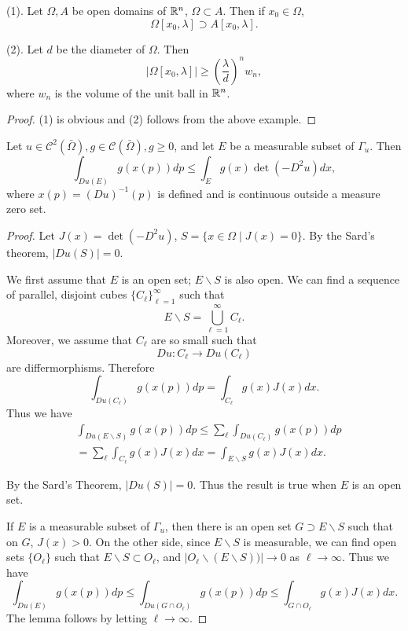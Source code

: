 \begin{lemma}\label{16} (1). Let $\Omega,A$ be open domains of $\mathbb R^n$, $\Omega\subset A$. Then if $x_0\in\Omega$,
\[
\Omega[x_0,\lambda]\supset A[x_0,\lambda].
\]

(2). Let $d$ be the diameter of $\Omega$. Then
\[
|\Omega[x_0,\lambda]|\geq\left(\frac{\lambda}{d}\right)^nw_n,
\]
where $w_n$ is the volume of the unit ball in $\mathbb R^n$.
\end{lemma}

\begin{proof} (1) is obvious and (2) follows from the above example.

\end{proof}

\begin{lemma}\label{17-2} Let $u\in \mathcal C^2(\bar\Omega), g\in \mathcal C(\bar\Omega), g\geq 0$, and let $E$ be a measurable subset of $\Gamma_u$. Then
\[
\int_{Du(E)}g(x(p))dp\leq\int_E g(x)\det(-D^2u) dx,
\]
where $x(p)=(Du)^{-1}(p)$ is defined and is continuous outside a measure zero set.
\end{lemma}

\begin{proof} Let $J(x)=\det(-D^2u)$, $S=\{x\in\Omega\mid J(x)=0\}$. By the Sard's theorem, $|Du(S)|=0$.

We first assume that $E$ is an open set; $E\backslash S$ is also open. We can find a sequence 
of parallel, disjoint cubes $\{C_\ell\}_{\ell=1}^\infty$ such that 
\[
E\backslash S=\bigcup_{\ell=1}^\infty C_\ell.
\]
Moreover, we assume that $C_\ell$ are so small such that
\[
Du: C_\ell\to Du(C_\ell)
\]
are differmorphisms. Therefore
\[
\int_{Du(C_\ell)}g(x(p)) dp=\int_{C_\ell} g(x)J(x) dx.
\]
Thus we have
\begin{align*}
&
\int_{Du(E\backslash S)} g(x(p))dp\leq\sum_\ell\int_{Du(C_\ell)}g(x(p))dp\\
&=\sum_\ell\int_{C_\ell} g(x)J(x) dx=\int_{E\backslash S} g(x)J(x) dx.
\end{align*}

By the Sard's Theorem, $|Du(S)|=0$. Thus the result is true when $E$ is an open set. 

If $E$ is a measurable subset of $\Gamma_u$, then there is an open set $G\supset E\backslash S$ such that on $G$, $J(x)>0$. On the other side, since $E\backslash S$ is measurable, we can find open sets $\{O_\ell\}$ such that $E\backslash S\subset O_\ell$, and $|O_\ell\backslash(E\backslash S))|\to 0$ as $\ell\to\infty$. Thus we have
\[
\int_{Du(E)}g(x(p))dp\leq\int_{Du(G\cap O_\ell)} g(x(p))dp\leq\int_{G\cap O_\ell} g(x)J(x) dx.
\]
The lemma follows by letting  $\ell\to\infty$.

\end{proof}


